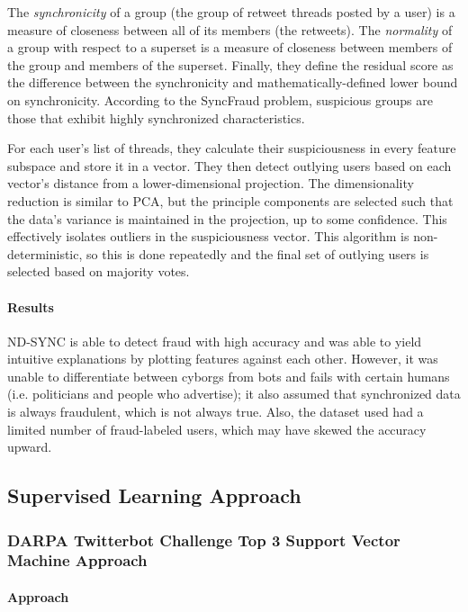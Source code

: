 \documentclass[11pt, oneside]{article}   	%
\begin{document}
\quad The \textit{synchronicity} of a group (the group of retweet threads posted
by a user) is a measure of closeness between all of its members (the retweets).
The \textit{normality} of a group with respect to a superset is a measure of
closeness between members of the group and members of the superset.  Finally,
they define the residual score as the difference between the synchronicity and
mathematically-defined lower bound on synchronicity.  According to the SyncFraud
problem, suspicious groups are those that exhibit highly synchronized
characteristics.

\quad For each user's list of threads, they calculate their suspiciousness in
every feature subspace and store it in a vector. They then detect outlying users
based on each vector's distance from a lower-dimensional projection. The
dimensionality reduction is similar to PCA, but the principle components are
selected such that the data's variance is maintained in the projection, up to
some confidence. This effectively isolates outliers in the suspiciousness
vector. This algorithm is non-deterministic, so this is done repeatedly and the
final set of outlying users is selected based on majority votes.

\paragraph{Results}
\quad

\quad ND-SYNC is able to detect fraud with high accuracy and was able to yield
intuitive explanations by plotting features against each other.  However, it was
unable to differentiate between cyborgs from bots and fails with certain humans
(i.e. politicians and people who advertise); it also assumed that synchronized
data is always fraudulent, which is not always true.  Also, the dataset used had
a limited number of fraud-labeled users, which may have skewed the accuracy
upward.

\subsection{Supervised Learning Approach}
\subsubsection{DARPA Twitterbot Challenge Top 3 Support Vector Machine Approach}

\paragraph{Approach}
\quad
\end{document}

